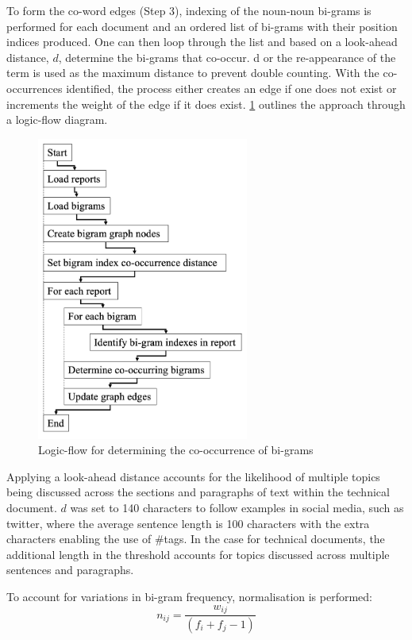 \documentclass[a4paper, 11pt]{article}
\begin{document}
To form the co-word edges (Step 3), indexing of the noun-noun bi-grams is performed for each document and an ordered list of bi-grams with their position indices produced. One can then loop through the list and based on a look-ahead distance, $d$, determine the bi-grams that co-occur. d or the re-appearance of the term is used as the maximum distance to prevent double counting. With the co-occurrences identified, the process either creates an edge if one does not exist or increments the weight of the edge if it does exist. \cref{lst:co} outlines the approach through a logic-flow diagram.

\begin{figure}[t]
  \centering
  \includegraphics[height=10cm]{figs/workflow.png}
  \caption{Logic-flow for determining the co-occurrence of bi-grams}\label{lst:co}
\end{figure}

Applying a look-ahead distance accounts for the likelihood of multiple topics being discussed across the sections and paragraphs of text within the technical document.
$d$ was set to 140 characters to follow examples in social media, such as twitter, where the average sentence length is 100 characters with the extra characters enabling the use of \#tags.
In the case for technical documents, the additional length in the threshold accounts for topics discussed across multiple sentences and paragraphs.

To account for variations in bi-gram frequency, normalisation is performed:
\begin{equation}
  n_{ij}=\frac{w_{ij}}{\left( f_i + f_j - 1 \right)}
\end{equation}
\end{document}
